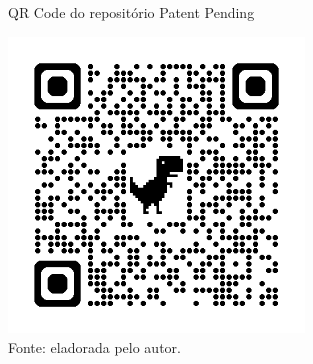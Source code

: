         \begin{figure}[h!]
        \captionsetup{width=1\textwidth} 
        \caption{\label{fig:qr_git} QR Code do repositório Patent Pending }
        \centering
        \includegraphics[width=0.7\textwidth]{figuras/qr_git.png} 
        \caption*{Fonte: eladorada pelo autor.}
    \end{figure}